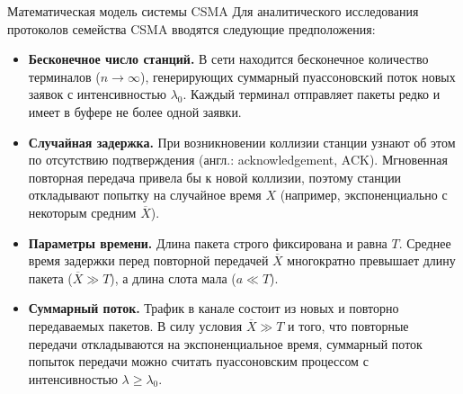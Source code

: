 \begin{center}
\end{center}

\begin{definition}{Математическая модель системы CSMA}
    Для аналитического исследования протоколов семейства CSMA вводятся следующие предположения:
    \begin{itemize}
        \item \textbf{Бесконечное число станций.} В сети находится бесконечное количество терминалов ($n \to \infty$), генерирующих суммарный пуассоновский поток новых заявок с интенсивностью $\lambda_0$. Каждый терминал отправляет пакеты редко и имеет в буфере не более одной заявки.
        \item \textbf{Случайная задержка.} При возникновении коллизии станции узнают об этом по отсутствию подтверждения (англ.: acknowledgement, ACK). Мгновенная повторная передача привела бы к новой коллизии, поэтому станции откладывают попытку на случайное время $X$ (например, экспоненциально с некоторым средним $\overline{X}$).
        \item \textbf{Параметры времени.} Длина пакета строго фиксирована и равна $T$. Среднее время задержки перед повторной передачей $\overline{X}$ многократно превышает длину пакета ($\overline{X} \gg T$), а длина слота мала ($a \ll T$).
        \item \textbf{Суммарный поток.} Трафик в канале состоит из новых и повторно передаваемых пакетов. В силу условия $\overline{X} \gg T$ и того, что повторные передачи откладываются на экспоненциальное время, суммарный поток попыток передачи можно считать пуассоновским процессом с интенсивностью $\lambda \ge \lambda_0$.
    \end{itemize}
\end{definition}

